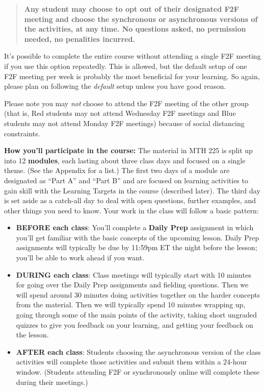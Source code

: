 \documentclass[]{article}
\providecommand{\tightlist}{%
  \setlength{\itemsep}{0pt}\setlength{\parskip}{0pt}}
\begin{document}
\begin{quote}
\textbf{Any student may choose to opt out of their designated F2F
meeting and choose the synchronous or asynchronous versions of the
activities, at any time. No questions asked, no permission needed, no
penalities incurred.}
\end{quote}

It's possible to complete the entire course without attending a single
F2F meeting if you use this option repeatedly. This is allowed, but the
default setup of one F2F meeting per week is probably the most
beneficial for your learning. So again, please plan on following the
\emph{default} setup unless you have good reason.

Please note you may \emph{not} choose to attend the F2F meeting of the
other group (that is, Red students may not attend Wednesday F2F meetings
and Blue students may not attend Monday F2F meetings) because of social
distancing constraints.

\textbf{How you'll participate in the course:} The material in MTH 225
is split up into 12 \textbf{modules}, each lasting about three class
days and focused on a single theme. (See the Appendix for a list.) The
first two days of a module are designated as ``Part A'' and ``Part B''
and are focused on learning activities to gain skill with the Learning
Targets in the course (described later). The third day is set aside as a
catch-all day to deal with open questions, further examples, and other
things you need to know. Your work in the class will follow a basic
pattern:

\begin{itemize}
\tightlist
\item
  \textbf{BEFORE each class}: You'll complete a \textbf{Daily Prep}
  assignment in which you'll get familiar with the basic concepts of the
  upcoming lesson. Daily Prep assignments will typically be due by
  11:59pm ET the night before the lesson; you'll be able to work ahead
  if you want.
\item
  \textbf{DURING each class}: Class meetings will typically start with
  10 minutes for going over the Daily Prep assignments and fielding
  questions. Then we will spend around 30 minutes doing activities
  together on the harder concepts from the material. Then we will
  typically spend 10 minutes wrapping up, going through some of the main
  points of the activity, taking short ungraded quizzes to give you
  feedback on your learning, and getting your feedback on the lesson.
\item
  \textbf{AFTER each class}: Students choosing the asynchronous version
  of the class activities will complete those activities and submit them
  within a 24-hour window. (Students attending F2F or synchronously
  online will complete these during their meetings.)
\end{itemize}
\end{document}
